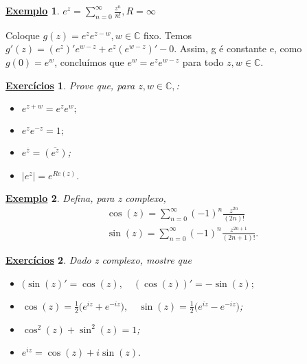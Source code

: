 \documentclass{article}
\newtheorem{example}{\underline{Exemplo}}[section]
\newtheorem*{exer*}{\underline{Exerc\'icios}}
\begin{document}
\begin{example}
  $e^z = \sum_{n=0}^{\infty}\frac{z^n}{n!}, R = \infty$
\end{example}
  Coloque $g(z) = e^ze^{z-w}, w\in\mathbb{C}$ fixo. Temos $g'(z) = (e^z)'e^{w-z} + e^z(e^{w-z})' - 0.$
Assim, g \'e constante e, como $g(0) = e^w$, conclu\'imos que $e^w = e^ze^{w-z}$ para todo
$z, w\in\mathbb{C}$.
\begin{exer*}
  Prove que, para $z, w\in\mathbb{C},$:
  \begin{itemize}
    \item[1)] $e^{z+w} = e^ze^w;$
    \item[2)] $e^ze^{-z} = 1;$
    \item[3)] $e^{\overline{z}} = \overline{(e^z)}$;
    \item[4)] $|e^z| = e^{Re(z)}.$
  \end{itemize}
\end{exer*}
\begin{example}
  Defina, para z complexo,
  \begin{align*}
    &\cos{(z)} = \sum_{n=0}^{\infty}(-1)^n\frac{z^{2n}}{(2n)!} \\
    &\sin{(z)} = \sum_{n=0}^{\infty}(-1)^n\frac{z^{2n+1}}{(2n+1)!}.
  \end{align*}
\end{example}
\begin{exer*}
  Dado z complexo, mostre que
  \begin{itemize}
    \item[i)] $(\sin{(z)}' = \cos{(z)}, \quad (\cos{(z)})' = -\sin{(z)};$
    \item[ii)] $\cos{(z)} = \frac{1}{2}\biggl(e^{iz} + e^{-iz}\biggr), \quad \sin{(z)} = \frac{1}{2}
    \biggl(e^{iz} - e^{-iz}\biggr)$; 
    \item[iii)] $\cos^2{(z)} + \sin^2{(z)} = 1$;
  \item[iv)] $e^{iz} = \cos{(z)} + i\sin{(z)}.$ 
  \end{itemize}
\end{exer*}
\end{document}
